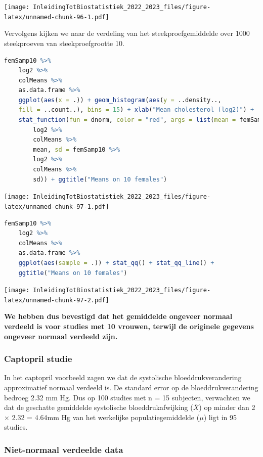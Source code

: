 \documentclass[
  12pt,dutch,coursenotes]{book}
\begin{document}
\texttt{[image: InleidingTotBiostatistiek\_2022\_2023\_files/figure-latex/unnamed-chunk-96-1.pdf]}

Vervolgens kijken we naar de verdeling van het steekproefgemiddelde over 1000 steekproeven van steekproefgrootte 10.

\begin{lstlisting}[language=R]
femSamp10 %>%
    log2 %>%
    colMeans %>%
    as.data.frame %>%
    ggplot(aes(x = .)) + geom_histogram(aes(y = ..density..,
    fill = ..count..), bins = 15) + xlab("Mean cholesterol (log2)") +
    stat_function(fun = dnorm, color = "red", args = list(mean = femSamp10 %>%
        log2 %>%
        colMeans %>%
        mean, sd = femSamp10 %>%
        log2 %>%
        colMeans %>%
        sd)) + ggtitle("Means on 10 females")
\end{lstlisting}

\texttt{[image: InleidingTotBiostatistiek\_2022\_2023\_files/figure-latex/unnamed-chunk-97-1.pdf]}

\begin{lstlisting}[language=R]
femSamp10 %>%
    log2 %>%
    colMeans %>%
    as.data.frame %>%
    ggplot(aes(sample = .)) + stat_qq() + stat_qq_line() +
    ggtitle("Means on 10 females")
\end{lstlisting}

\texttt{[image: InleidingTotBiostatistiek\_2022\_2023\_files/figure-latex/unnamed-chunk-97-2.pdf]}

\textbf{We hebben dus bevestigd dat het gemiddelde ongeveer normaal verdeeld is voor studies met 10 vrouwen, terwijl de originele gegevens ongeveer normaal verdeeld zijn.}

\hypertarget{captopril-studie}{%
\subsubsection{Captopril studie}\label{captopril-studie}}

In het captopril voorbeeld zagen we dat de systolische bloeddrukverandering approximatief normaal verdeeld is.
De standard error op de bloeddrukverandering bedroeg 2.32 mm Hg.
Dus op 100 studies met n = 15 subjecten, verwachten we dat de geschatte gemiddelde systolische bloeddrukafwijking (\(\bar X\)) op minder dan 2 × 2.32 = 4.64mm Hg van het werkelijke populatiegemiddelde (\(\mu\)) ligt in 95 studies.

\hypertarget{niet-normaal-verdeelde-data}{%
\subsubsection{Niet-normaal verdeelde data}\label{niet-normaal-verdeelde-data}}
\end{document}
